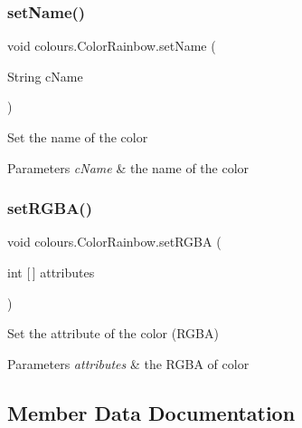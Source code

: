 \subsubsection{\texorpdfstring{set\+Name()}{setName()}}
{\footnotesize\ttfamily void colours.\+Color\+Rainbow.\+set\+Name (\begin{DoxyParamCaption}\item[{String}]{c\+Name }\end{DoxyParamCaption})\hspace{0.3cm}{\ttfamily [inline]}}

Set the name of the color 
\begin{DoxyParams}{Parameters}
{\em c\+Name} & the name of the color \\
\hline
\end{DoxyParams}
\mbox{\label{classcolours_1_1_color_rainbow_a68e01c5237778bf54cba5990def3851a}} 
\subsubsection{\texorpdfstring{set\+R\+G\+B\+A()}{setRGBA()}}
{\footnotesize\ttfamily void colours.\+Color\+Rainbow.\+set\+R\+G\+BA (\begin{DoxyParamCaption}\item[{int \mbox{[}$\,$\mbox{]}}]{attributes }\end{DoxyParamCaption})\hspace{0.3cm}{\ttfamily [inline]}}

Set the attribute of the color (R\+G\+BA) 
\begin{DoxyParams}{Parameters}
{\em attributes} & the R\+G\+BA of color \\
\hline
\end{DoxyParams}


\subsection{Member Data Documentation}
\mbox{\label{classcolours_1_1_color_rainbow_ae74af795ded4a45f8bffdc26f971903a}} 
